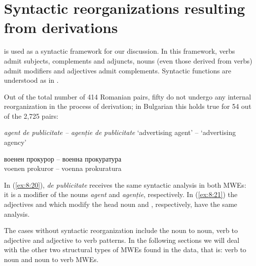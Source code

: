 \documentclass[output=paper]{langsci/langscibook}
\begin{document}
\clearpage 


\section{Syntactic reorganizations resulting from derivations}
\label{section6}

 is used as a syntactic framework for our discussion.
In this framework, verbs admit subjects, complements and adjuncts,
nouns (even those derived from verbs) admit modifiers and adjectives
admit complements. Syntactic functions are understood as in \cite{quirk1985}.



Out of the total number of 414 Romanian pairs, fifty do not undergo any
internal reorganization in the process of derivation; in Bulgarian this
holds true for 54 out of the 2,725 pairs: 

\begin{exe}
\ex \label{ex:8:20}
\settowidth{}
\textit{agent de publicitate -- agenție de publicitate}  
‘advertising agent’ -- ‘advertising agency’
\end{exe}





\begin{exe}
\ex \label{ex:8:21}
\settowidth{}
\gll военен прокурор -- военна прокуратура\\
voenen prokuror – voenna prokuratura\\  
\end{exe}

In (\ref{ex:8:20}), \textit{de publicitate} receives the same syntactic analysis in both
MWEs: it is a modifier of the nouns \textit{agent} and \textit{agenție},
respectively. In (\ref{ex:8:21}) the adjectives 
 and 
 which modify
the head noun 
  and 
, respectively, have the same
analysis. 



The cases without syntactic reorganization include the noun to noun,
verb to adjective and adjective to verb patterns. In the following
sections we will deal with the other two structural types of MWEs found
in the data, that is: verb to noun and noun to verb MWEs.
\end{document}
